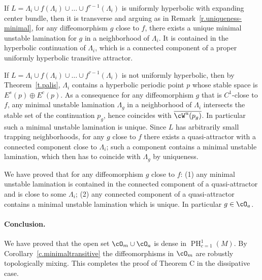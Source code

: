 \documentclass[a4paper,11pt]{amsart}
\numberwithin{equation}{section}     %
\theoremstyle{definition}
\theoremstyle{remark}
\DeclareMathOperator{\PH}{PH}
\begin{document}
If $L=\Lambda_i\cup f(\Lambda_i)\cup \dots\cup f^{\tau-1}(\Lambda_i)$ is uniformly hyperbolic with expanding center bundle, 
then it is transverse and arguing as in Remark~\ref{r.uniqueness-minimal}, for any diffeomorphism $g$ close to $f$,
there exists a unique minimal unstable lamination for $g$ in a neighborhood of $\Lambda_i$. It is contained in the hyperbolic continuation of $\Lambda_i$, which is a connected component of a proper uniformly hyperbolic transitive attractor.

If $L=\Lambda_i\cup f(\Lambda_i)\cup \dots\cup f^{\tau-1}(\Lambda_i)$ is not uniformly hyperbolic,
then by Theorem~\ref{t.palis}, $\Lambda_i$ contains a hyperbolic periodic point $p$ whose stable space is
$E^s(p)\oplus E^c(p)$. As a consequence for any diffeomorphism $g$ that is $C^1$-close to $f$,
any minimal unstable lamination $\Lambda_g$ in a neighborhood of $\Lambda_i$ intersects the stable set of the continuation $p_g$, hence coincides with $\overline {\cW^u(p_g)}$. In particular such a minimal unstable lamination is unique. Since $L$ has arbitrarily small trapping neighborhoods,
for any $g$ close to $f$ there exists a quasi-attractor with a connected component close to $\Lambda_i$;
such a component contains a minimal unstable lamination, which then has to coincide with $\Lambda_g$ by uniqueness.

We have proved that for any diffeomorphism $g$ close to $f$: (1) any minimal unstable lamination is contained in the connected component of a quasi-attractor
and is close to some $\Lambda_i$; (2) any connected component of a quasi-attractor contains a minimal unstable lamination which is unique.
In particular $g \in \cO_a$.
\medskip

\paragraph{\bf Conclusion.}
We have proved that the open set $\cO_m\cup \cO_a$ is dense in $\PH^1_{c=1}(M)$.
By Corollary~\ref{c.minimaltransitive} the diffeomorphisms in $\cO_m$ are robustly topologically mixing.
This completes the proof of Theorem C in the dissipative case.
\end{document}

